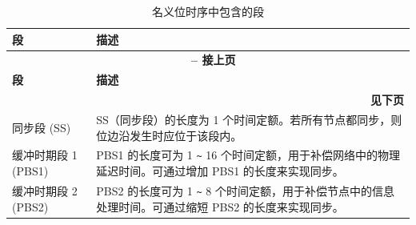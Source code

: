 \begin{longtable}[c]{|p{2.5cm}|p{13cm}|} 
    
  \caption{名义位时序中包含的段}
  \label{tab:twai-seg-of-a-nominal-bit-time} 
  \\\hline
  \rowcolor{lightgray}
  \textbf{段} & \textbf{描述}
  \\\hline
  \endfirsthead
  
  \multicolumn{2}{c}{\bfseries \tablename\ \thetable{} -- 接上页}\\  \hline
  
  \rowcolor{lightgray}
    \textbf{段} & \textbf{描述}
  \\\hline
  \endhead
  
  \multicolumn{2}{r}{\textbf{见下页}} \\
  \endfoot
  \endlastfoot

    同步段 (SS) & SS（同步段）的长度为 1 个时间定额。若所有节点都同步，则位边沿发生时应位于该段内。
            \\\hline
    缓冲时期段 1 (PBS1) & PBS1 的长度可为 1 \verb+~+ 16 个时间定额，用于补偿网络中的物理延迟时间。可通过增加 PBS1 的长度来实现同步。
            \\\hline
    缓冲时期段 2 (PBS2) & PBS2 的长度可为 1 \verb+~+ 8 个时间定额，用于补偿节点中的信息处理时间。可通过缩短 PBS2 的长度来实现同步。
            \\\hline
    
\end{longtable}
